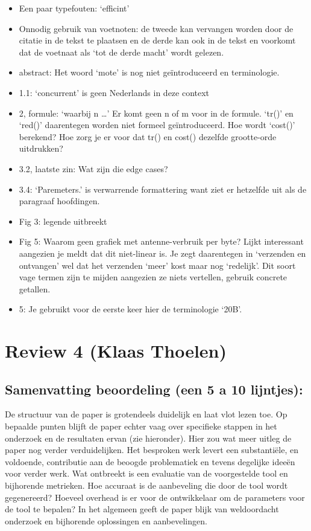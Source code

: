 \documentclass[11pt]{article}
\begin{document}
\begin{itemize}
\item Een paar typefouten: ‘efficint’
\item Onnodig gebruik van voetnoten: de tweede kan vervangen worden door de citatie in de tekst te plaatsen en de derde kan ook in de tekst en voorkomt dat de voetnaat als ‘tot de derde macht’ wordt gelezen.
\item abstract: Het woord ‘mote’ is nog niet geïntroduceerd en terminologie.
\item 1.1: ‘concurrent’ is geen Nederlands in deze context
\item 2, formule: ‘waarbij n …’ Er komt geen n of m voor in de formule. ‘tr()’ en ‘red()’ daarentegen worden niet formeel geïntroduceerd. Hoe wordt ‘cost()’ berekend? Hoe zorg je er voor dat tr() en cost() dezelfde grootte-orde uitdrukken?
\item 3.2, laatste zin: Wat zijn die edge cases?
\item 3.4: ‘Paremeters.’ is verwarrende formattering want ziet er hetzelfde uit als de paragraaf hoofdingen.
\item Fig 3: legende uitbreekt
\item Fig 5: Waarom geen grafiek met antenne-verbruik per byte? Lijkt interessant aangezien je meldt dat dit niet-linear is. Je zegt daarentegen in ‘verzenden en ontvangen’ wel dat het verzenden ‘meer’ kost maar nog ‘redelijk’. Dit soort vage termen zijn te mijden aangezien ze niets vertellen, gebruik concrete getallen.
\item 5: Je gebruikt voor de eerste keer hier de terminologie ‘20B’.
\end{itemize}

\section{Review 4 (Klaas Thoelen)}

\subsection{Samenvatting beoordeling (een 5 a 10 lijntjes):}
De structuur van de paper is grotendeels duidelijk en laat vlot lezen toe. Op
bepaalde punten blijft de paper echter vaag over specifieke stappen in het
onderzoek en de resultaten ervan (zie hieronder). Hier zou wat meer uitleg de
paper nog verder verduidelijken. Het besproken werk levert een substantiële, en
voldoende, contributie aan de beoogde problematiek en tevens degelijke ideeën
voor verder werk. Wat ontbreekt is een evaluatie van de voorgestelde tool en
bijhorende metrieken. Hoe accuraat is de aanbeveling die door de tool wordt
gegenereerd? Hoeveel overhead is er voor de ontwikkelaar om de parameters voor
de tool te bepalen? In het algemeen geeft de paper blijk van weldoordacht
onderzoek en bijhorende oplossingen en aanbevelingen.
\end{document}
